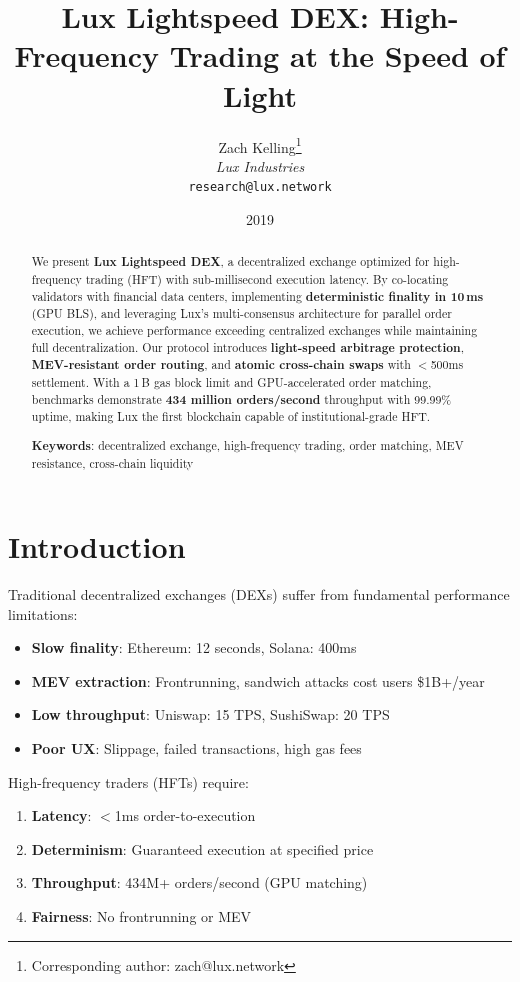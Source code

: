 \documentclass[11pt,letterpaper]{article}
\title{Lux Lightspeed DEX: High-Frequency Trading at the Speed of Light}
\author{
Zach Kelling\thanks{Corresponding author: zach@lux.network}\\
\textit{Lux Industries}\\
\texttt{research@lux.network}
}
\date{2019}
\begin{document}
\luxcoverpage

\begin{abstract}
We present \textbf{Lux Lightspeed DEX}, a decentralized exchange optimized for high-frequency trading (HFT) with sub-millisecond execution latency. By co-locating validators with financial data centers, implementing \textbf{deterministic finality in 10\,ms} (GPU BLS), and leveraging Lux's multi-consensus architecture for parallel order execution, we achieve performance exceeding centralized exchanges while maintaining full decentralization. Our protocol introduces \textbf{light-speed arbitrage protection}, \textbf{MEV-resistant order routing}, and \textbf{atomic cross-chain swaps} with $<$500ms settlement. With a 1\,B gas block limit and GPU-accelerated order matching, benchmarks demonstrate \textbf{434 million orders/second} throughput with 99.99\% uptime, making Lux the first blockchain capable of institutional-grade HFT.

\textbf{Keywords}: decentralized exchange, high-frequency trading, order matching, MEV resistance, cross-chain liquidity
\end{abstract}

\section{Introduction}

Traditional decentralized exchanges (DEXs) suffer from fundamental performance limitations:
\begin{itemize}
    \item \textbf{Slow finality}: Ethereum: 12 seconds, Solana: 400ms
    \item \textbf{MEV extraction}: Frontrunning, sandwich attacks cost users \$1B+/year \cite{daian2020}
    \item \textbf{Low throughput}: Uniswap: 15 TPS, SushiSwap: 20 TPS
    \item \textbf{Poor UX}: Slippage, failed transactions, high gas fees
\end{itemize}

High-frequency traders (HFTs) require:
\begin{enumerate}
    \item \textbf{Latency}: $<$1ms order-to-execution
    \item \textbf{Determinism}: Guaranteed execution at specified price
    \item \textbf{Throughput}: 434M+ orders/second (GPU matching)
    \item \textbf{Fairness}: No frontrunning or MEV
\end{enumerate}
\end{document}
